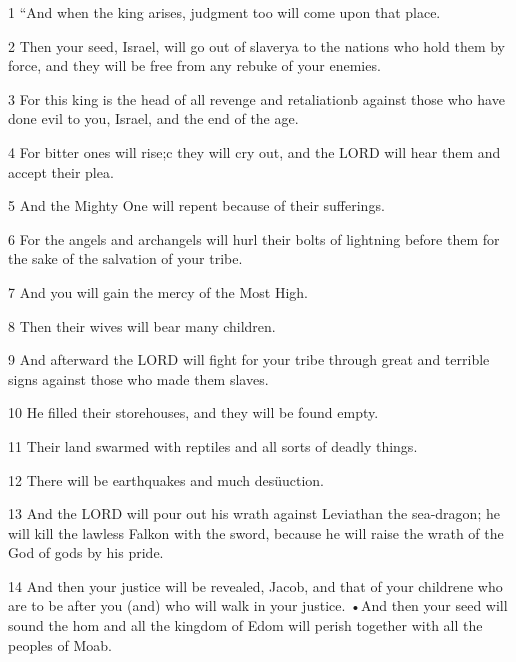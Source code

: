 \par 1 “And when the king arises, judgment too will come upon that place. 

\par 2 Then your seed, Israel, will go out of slaverya to the nations who hold them by force, and they will be free from any rebuke of your enemies. 

\par 3 For this king is the head of all revenge and retaliationb against those who have done evil to you, Israel, and the end of the age. 

\par 4 For bitter ones will rise;c they will cry out, and the LORD will hear them and accept their plea. 

\par 5 And the Mighty One will repent because of their sufferings. 

\par 6 For the angels and archangels will hurl their bolts of lightning before them for the sake of the salvation of your tribe. 

\par 7 And you will gain the mercy of the Most High. 

\par 8 Then their wives will bear many children. 

\par 9 And afterward the LORD will fight for your tribe through great and terrible signs against those who made them slaves. 

\par 10 He filled their storehouses, and they will be found empty. 

\par 11 Their land swarmed with reptiles and all sorts of deadly things.

\par 12 There will be earthquakes and much desüuction. 

\par 13 And the LORD will pour out his wrath against Leviathan the sea-dragon; he will kill the lawless Falkon with the sword, because he will raise the wrath of the God of gods by his pride. 

\par 14 And then your justice will be revealed, Jacob, and that of your childrene who are to be after you (and) who will walk in your justice. •And then your seed will sound the hom and all the kingdom of Edom will perish together with all the peoples of Moab.

